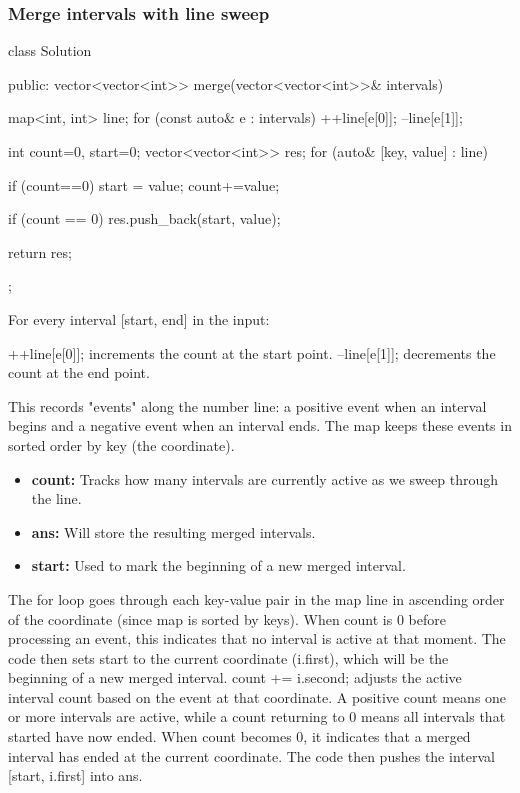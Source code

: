 \documentclass{report}
\begin{document}
\subsubsection{Merge intervals with line sweep}
\bigbreak \noindent 
\begin{cppcode}
    class Solution {
        public:
        vector<vector<int>> merge(vector<vector<int>>& intervals) {
            map<int, int> line;
            for (const auto& e : intervals) {
                ++line[e[0]];
                --line[e[1]];
            }

            int count=0, start=0;
            vector<vector<int>> res;
            for (auto& [key, value] : line) {
                if (count==0) {
                    start = value;
                }
                count+=value;

                if (count == 0) {
                    res.push_back({start, value});
                }
            }
            return res;
        }
    };
\end{cppcode}
\bigbreak \noindent 
For every interval [start, end] in the input:
\begin{itemize}
    ++line[e[0]]; increments the count at the start point.
    --line[e[1]]; decrements the count at the end point.
\end{itemize}
\bigbreak \noindent 
This records "events" along the number line: a positive event when an interval begins and a negative event when an interval ends. The map keeps these events in sorted order by key (the coordinate).
\begin{itemize}
    \item \textbf{count:} Tracks how many intervals are currently active as we sweep through the line.
    \item \textbf{ans:} Will store the resulting merged intervals.
    \item \textbf{start:} Used to mark the beginning of a new merged interval.
\end{itemize}
\bigbreak \noindent 
The for loop goes through each key-value pair in the map line in ascending order of the coordinate (since map is sorted by keys).
\bigbreak \noindent 
When count is 0 before processing an event, this indicates that no interval is active at that moment. The code then sets start to the current coordinate (i.first), which will be the beginning of a new merged interval.
\bigbreak \noindent 
count += i.second; adjusts the active interval count based on the event at that coordinate.
\bigbreak \noindent 
A positive count means one or more intervals are active, while a count returning to 0 means all intervals that started have now ended.
\bigbreak \noindent 
When count becomes 0, it indicates that a merged interval has ended at the current coordinate.
\bigbreak \noindent 
The code then pushes the interval [start, i.first] into ans.
\end{document}
